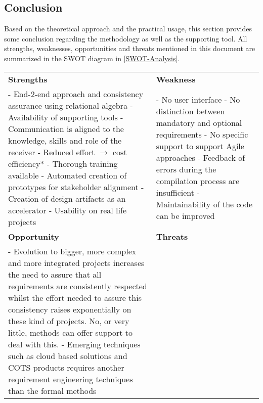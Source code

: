 
\subsection{Conclusion}
\label{sec:approachconclusion}
Based on the theoretical approach and the practical usage, this section provides some conclusion regarding the methodology as well as the supporting tool.
All strengths, weaknesses, opportunities and threats mentioned in this document are summarized in the SWOT diagram in \autoref{SWOT-Analysis}.

\begin{table}[ht!]
\small
\begin{tabular}{|p{8cm}||p{8cm}|}\hline
\cellcolor[HTML]{9B9B9B}\textbf{Strengths} & \cellcolor[HTML]{9B9B9B}\textbf{Weakness} \\

- End-2-end approach and consistency assurance using relational algebra\newline
- Availability of supporting tools \newline
- Communication is aligned to the knowledge, skills and role of the receiver \newline
- Reduced effort $\rightarrow$ cost efficiency* \newline
- Thorough training available \newline
- Automated creation of prototypes for stakeholder alignment \newline
- Creation of design artifacts as an accelerator \newline
- Usability on real life projects &%
%
- No user interface\newline
- No distinction between mandatory and optional requirements \newline
- No specific support to support Agile approaches \newline
- Feedback of errors during the compilation process are insufficient \newline
- Maintainability of the code can be improved \\\hline\hline

\cellcolor[HTML]{9B9B9B}\textbf{Opportunity} & \cellcolor[HTML]{9B9B9B}\textbf{Threats} \\
- Evolution to bigger, more complex and more integrated projects increases the need to assure that all requirements are consistently respected whilst the effort needed to assure this consistency raises exponentially on these kind of projects. No, or very little, methods can offer support to deal with this.\newline
- Emerging techniques such as cloud based solutions and COTS products requires another requirement engineering techniques than the formal  methods &


\end{tabular}
\end{table}
